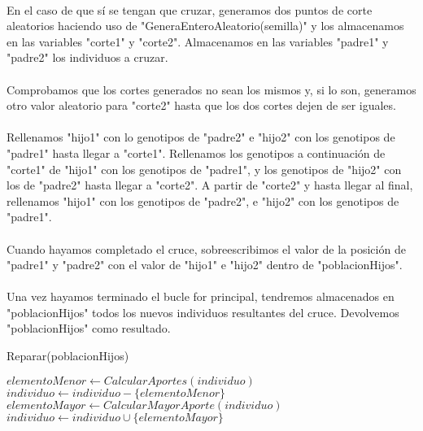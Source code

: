 	\paragraph{}En el caso de que sí se tengan que cruzar, generamos dos puntos de corte aleatorios haciendo uso de "GeneraEnteroAleatorio(semilla)" y los almacenamos en las variables "corte1" y "corte2". Almacenamos en las variables "padre1" y "padre2" los individuos a cruzar.
	
	\paragraph{}Comprobamos que los cortes generados no sean los mismos y, si lo son, generamos otro valor aleatorio para "corte2" hasta que los dos cortes dejen de ser iguales.
	
	\paragraph{}Rellenamos "hijo1" con lo genotipos de "padre2" e "hijo2" con los genotipos de "padre1" hasta llegar a "corte1". Rellenamos los genotipos a continuación de "corte1" de "hijo1" con los genotipos de "padre1", y los genotipos de "hijo2" con los de "padre2" hasta llegar a "corte2". A partir de "corte2" y hasta llegar al final, rellenamos "hijo1" con los genotipos de "padre2", e "hijo2" con los genotipos de "padre1".
	
	\paragraph{}Cuando hayamos completado el cruce, sobreescribimos el valor de la posición de "padre1" y "padre2" con el valor de "hijo1" e "hijo2" dentro de  "poblacionHijos". 
	
	\paragraph{}Una vez hayamos terminado el bucle for principal, tendremos almacenados en "poblacionHijos" todos los nuevos individuos resultantes del cruce. Devolvemos "poblacionHijos" como resultado.

	\begin{algorithm}[H]
		\caption{Reparar(poblacionHijos)}
		\begin{algorithmic}
			
			\STATE $elementoMenor \leftarrow CalcularAportes(individuo)$
			\STATE $individuo \leftarrow individuo-\{elementoMenor\}$
			\ENDWHILE
			\STATE $elementoMayor \leftarrow CalcularMayorAporte(individuo)$
			\STATE $individuo \leftarrow individuo\cup\{elementoMayor\}$
			\ENDIF
			\ENDIF
			\ENDFOR
		\end{algorithmic}
	\end{algorithm}

